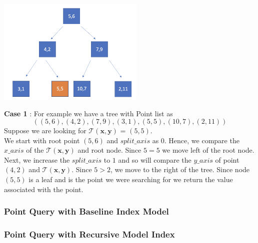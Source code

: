 \begin{mscexample}

    \begin{minipage}[t]{\linewidth}
        \centering
        \includegraphics[width=7cm]{graphs/KD_Tree_Point_Query_Tree.png}
        \label{fig:$K$D-Tree_for_Point Query}
    \end{minipage}
    
    \textbf{Case 1} : For example we have a tree with Point list as 
	$$((5,6),(4,2),(7,9),(3,1),(5,5),(10,7),(2,11))$$
 Suppose we are looking for $\mathcal{T}(\boldsymbol{x}, \boldsymbol{y})$ = $(5,5)$.\\
 We start with root point $(5,6)$ and $split\_axis$ as $0$. Hence, we compare the $x\_axis$ of the $\mathcal{T}(\boldsymbol{x}, \boldsymbol{y})$ and root node. Since $5 = 5$ we move left of the root node. \\
 Next, we increase the $split\_axis$ to $1$ and so will compare the $y\_axis$ of point $(4,2)$ and  $\mathcal{T}(\boldsymbol{x}, \boldsymbol{y})$. Since $5 > 2$, we move to the right of the tree. Since node $(5,5)$ is a leaf and is the point we were searching for we return the value associated with the point. 

\end{mscexample}

\subsubsection{Point Query with Baseline Index Model}



\subsubsection{Point Query with Recursive Model Index}

